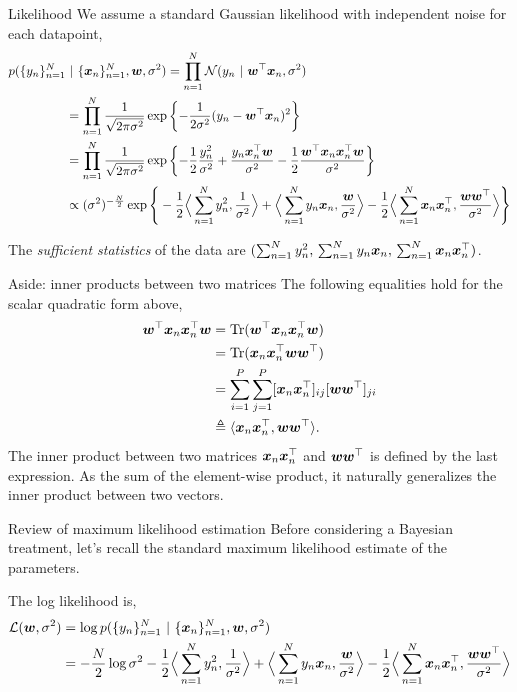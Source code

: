 \documentclass[aspectratio=169]{beamer}
\begin{document}
\begin{frame}{Likelihood}
We assume a standard Gaussian likelihood with independent noise for each datapoint,
\begin{align}
    p(\{y_n\}_{n=1}^N &~\vert~ \{\boldsymbol{x}_n\}_{n=1}^N, \boldsymbol{w}, \sigma^2) 
    = 
    \prod_{n=1}^N \mathcal{N}(y_n ~\vert~ \boldsymbol{w}^\top \boldsymbol{x}_n, \sigma^2) \\
    &= \prod_{n=1}^N \frac{1}{\sqrt{2 \pi \sigma^2}} \exp \left\{ -\frac{1}{2\sigma^2} (y_n - \boldsymbol{w}^\top \boldsymbol{x}_n)^2 \right \} \\
    &= \prod_{n=1}^N \frac{1}{\sqrt{2 \pi \sigma^2}} \exp \left\{ -\frac{1}{2} \frac{y_n^2 }{\sigma^2} + \frac{y_n \boldsymbol{x}_n^\top \boldsymbol{w}}{\sigma^2} - \frac{1}{2} \frac{\boldsymbol{w}^\top \boldsymbol{x}_n \boldsymbol{x}_n^\top \boldsymbol{w}}{\sigma^2}  \right \} \\
    \label{eq:ch1_lkhd}
    &\propto (\sigma^2)^{-\frac{N}{2}} \exp \Bigg\{ 
    -\frac{1}{2} \Big \langle \sum_{n=1}^N y_n^2, \frac{1}{\sigma^2} \Big \rangle 
    + \Big \langle \sum_{n=1}^N y_n \boldsymbol{x}_n, \frac{\boldsymbol{w}}{\sigma^2} \Big \rangle 
    - \frac{1}{2} \Big \langle \sum_{n=1}^N \boldsymbol{x}_n \boldsymbol{x}_n^\top, \frac{\boldsymbol{w} \boldsymbol{w}^\top }{\sigma^2} \Big \rangle  \Bigg \}
\end{align}

The \emph{sufficient statistics} of the data are $(\sum_{n=1}^N y_n^2, \, \sum_{n=1}^N y_n \boldsymbol{x}_n, \, \sum_{n=1}^N \boldsymbol{x}_n \boldsymbol{x}_n^\top)$. 
\end{frame}

\begin{frame}{Aside: inner products between two matrices}
The following equalities hold for the scalar quadratic form above,
\begin{align}
    \boldsymbol{w}^\top \boldsymbol{x}_n \boldsymbol{x}_n^\top \boldsymbol{w} &= \textrm{Tr}(\boldsymbol{w}^\top \boldsymbol{x}_n \boldsymbol{x}_n^\top \boldsymbol{w}) \\
    &= \textrm{Tr}(\boldsymbol{x}_n \boldsymbol{x}_n^\top \boldsymbol{w} \boldsymbol{w}^\top) \\
    &= \sum_{i=1}^P \sum_{j=1}^P [\boldsymbol{x}_n \boldsymbol{x}_n^\top]_{ij} [\boldsymbol{w} \boldsymbol{w}^\top]_{ji} \\
    &\triangleq \langle \boldsymbol{x}_n \boldsymbol{x}_n^\top, \boldsymbol{w} \boldsymbol{w}^\top \rangle.
\end{align}
The inner product between two matrices $\boldsymbol{x}_n \boldsymbol{x}_n^\top$ and $\boldsymbol{w} \boldsymbol{w}^\top$ is defined by the last expression. As the sum of the element-wise product, it naturally generalizes the inner product between two vectors.
\end{frame}


\begin{frame}{Review of maximum likelihood estimation}
Before considering a Bayesian treatment, let's recall the standard maximum likelihood estimate of the parameters. 

The log likelihood is,
\begin{align}
    \mathcal{L}(\boldsymbol{w}, \sigma^2) &= \log p(\{y_n\}_{n=1}^N ~\vert~ \{\boldsymbol{x}_n\}_{n=1}^N, \boldsymbol{w}, \sigma^2) \\
    &= -\frac{N}{2} \log \sigma^2 
    -\frac{1}{2} \Big \langle \sum_{n=1}^N y_n^2, \frac{1}{\sigma^2} \Big \rangle 
    + \Big \langle \sum_{n=1}^N y_n \boldsymbol{x}_n, \frac{\boldsymbol{w}}{\sigma^2} \Big \rangle 
    - \frac{1}{2} \Big \langle \sum_{n=1}^N \boldsymbol{x}_n \boldsymbol{x}_n^\top, \frac{\boldsymbol{w} \boldsymbol{w}^\top }{\sigma^2} \Big \rangle  
\end{align}
\end{frame}
\end{document}
